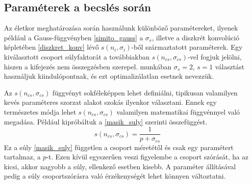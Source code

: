 \documentclass[12pt]{article}
\begin{document}
\subsection{Paraméterek a becslés során} \label{parameterek_subsection}
Az életkor meghatározása során használunk különböző paramétereket, ilyenek például a Gauss-függvényben \eqref{simito_gauss} a $\sigma_s$\iffalse TODO: na jó nem biztos, hogy így szép \fi, illetve a diszkrét konvolúció képletében \eqref{diszkret_konv} lévő $s(n_i, \sigma_i)$-ből származtatott paraméterek. Egy kiválasztott csoport súlyfaktorát a továbbiakban $s(n_{cs}, \sigma_{cs})$-vel fogjuk jelölni, hiszen a kifejezés nem összegzésben szerepel.  munkában $\sigma_s=2$, $s=1$ választást használjuk kiindulópontnak, és
ezt optimalizálatlan esetnek nevezzük.

Az $s(n_{cs},\sigma_{cs})$ függvényt sokféleképpen lehet definiálni, tipikusan valamilyen kevés paraméteres szorzat alakot szokás ilyenkor választani.
Ennek egy természetes módja lehet $s(n_{cs},\sigma_{cs})$ valamilyen matematikai függvénnyel való megadása.
Például kipróbáltuk a \eqref{masik_suly} szerinti összefüggést.
\begin{equation} \label{masik_suly}
s(n_{cs}, \sigma_{cs}) = \frac{1}{p + \sigma_{cs}}
\end{equation}
Ez a súly \eqref{masik_suly} független a csoport méretétől és csak egy paramétert tartalmaz, a $p$-t. Ezen kívül egyszerűen veszi figyelembe a csoport szórását, ha az kicsi, akkor nagyobb a súly, ellenkező esetben kisebb. A paraméter állításával pedig a súly csoportszórásra való érzékenységét lehet könnyen változtatni.
\end{document}
